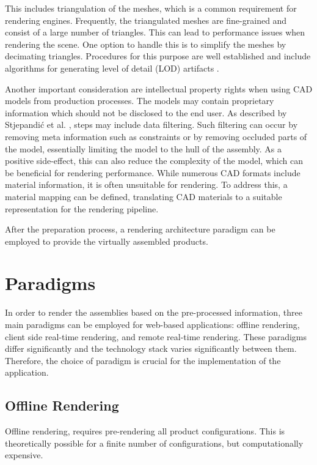 This includes triangulation of the meshes, which is a common requirement for rendering engines. Frequently, the triangulated meshes are fine-grained and consist of a large number of triangles. This can lead to performance issues when rendering the scene. One option to handle this is to simplify the meshes by decimating triangles. Procedures for this purpose are well established and include algorithms for generating level of detail (\gls{LOD}) artifacts \cite{luebke2003level}.

Another important consideration are intellectual property rights when using \gls{CAD} models from production processes. The models may contain proprietary information which should not be disclosed to the end user. As described by Stjepandić et al. \cite{ipr}, steps may include data filtering. Such filtering can occur by removing meta information such as constraints or by removing occluded parts of the model, essentially limiting the model to the hull of the assembly. As a positive side-effect, this can also reduce the complexity of the model, which can be beneficial for rendering performance.
While numerous \gls{CAD} formats include material information, it is often unsuitable for rendering. To address this, a material mapping can be defined, translating \gls{CAD} materials to a suitable representation for the rendering pipeline.

After the preparation process, a rendering architecture paradigm can be employed to provide the virtually assembled products.

\section{Paradigms}

In order to render the assemblies based on the pre-processed information, three main paradigms can be employed for web-based applications: offline rendering, client side real-time rendering, and remote real-time rendering. These paradigms differ significantly and the technology stack varies significantly between them. Therefore, the choice of paradigm is crucial for the implementation of the application.

\subsection*{Offline Rendering}

Offline rendering, requires pre-rendering all product configurations. This is theoretically possible for a finite number of configurations, but computationally expensive. 

